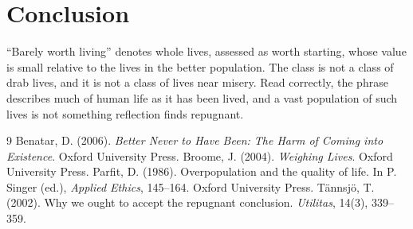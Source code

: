 \documentclass{situationist-preprint}
\begin{document}
\section{Conclusion}

\enquote{Barely worth living} denotes whole lives, assessed as worth starting, whose value is small relative to the lives in the better population. The class is not a class of drab lives, and it is not a class of lives near misery. Read correctly, the phrase describes much of human life as it has been lived, and a vast population of such lives is not something reflection finds repugnant.

\begin{thebibliography}{9}\small
{} Benatar, D. (2006). \emph{Better Never to Have Been: The Harm of Coming into Existence}. Oxford University Press.
 Broome, J. (2004). \emph{Weighing Lives}. Oxford University Press.
 Parfit, D. (1986). Overpopulation and the quality of life. In P. Singer (ed.), \emph{Applied Ethics}, 145--164. Oxford University Press.
 T{\"a}nnsj{\"o}, T. (2002). Why we ought to accept the repugnant conclusion. \emph{Utilitas}, 14(3), 339--359.
\end{thebibliography}
\end{document}
